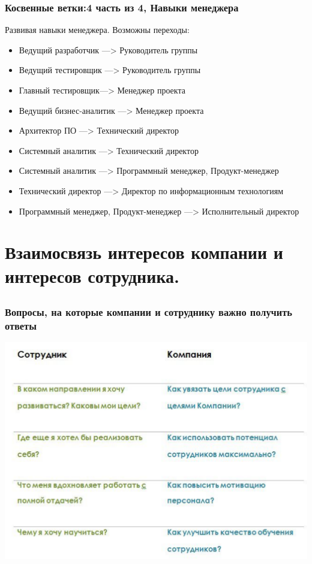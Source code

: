\documentclass{../industrial-development}
\begin{document}
{\begin{frame} \frametitle{Косвенные ветки:4 часть из 4, Навыки менеджера}

\begin{block}{Развивая навыки менеджера.}
Возможны переходы:
  \end{block}
\begin{itemize}
  \item Ведущий разработчик ---> Руководитель группы
  \item Ведущий тестировщик ---> Руководитель группы
\item Главный тестировщик---> Менеджер проекта
 \item Ведущий бизнес-аналитик ---> Менеджер проекта
  \item Архитектор ПО  ---> Технический директор
\item  Системный аналитик ---> Технический директор
 \item Системный аналитик ---> Программный менеджер, Продукт-менеджер
  \item Технический директор ---> Директор по информационным технологиям
\item  Программный менеджер, Продукт-менеджер  ---> Исполнительный директор
  \end{itemize}
\end{frame}





\section{Взаимосвязь интересов компании и интересов сотрудника. }

\subsection{}

\begin{frame} \frametitle{Вопросы, на которые компании и сотруднику важно получить ответы}
  \centerline{\includegraphics[height=0.82\textheight]{11-IT-specialist's-way/vop.pdf}}
\end{frame}


}
\end{document}
